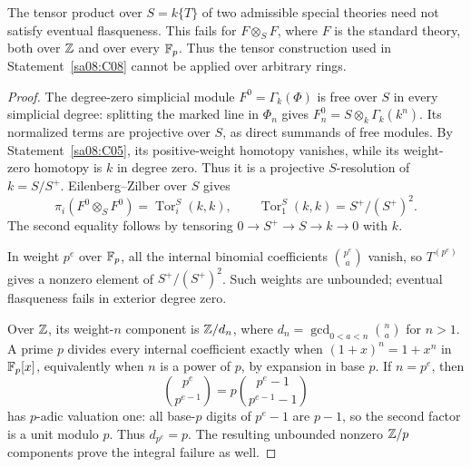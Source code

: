 \begin{proposition}\label{sa08:C11}
The tensor product over $S=k\{T\}$ of two admissible special
theories need not satisfy eventual flasqueness. This fails for
$F\otimes_S F$, where $F$ is the standard theory, both over $\mathbb Z$
and over every $\mathbb F_p$. Thus the tensor construction used in
Statement~\ref{sa08:C08} cannot be applied over arbitrary rings.
\end{proposition}
\begin{proof}
The degree-zero simplicial module $F^0=\Gamma_k(\Phi)$ is free over
$S$ in every simplicial degree: splitting the marked line in
$\Phi_n$ gives $F_n^0=S\otimes_k\Gamma_k(k^n)$. Its normalized
terms are projective over $S$, as direct summands of free modules.
By Statement~\ref{sa08:C05}, its positive-weight homotopy vanishes,
while its weight-zero homotopy is $k$ in degree zero. Thus it is a
projective $S$-resolution of $k=S/S^+$. Eilenberg--Zilber over $S$
gives
\[
 \pi_i(F^0\otimes_S F^0)=\operatorname{Tor}_i^S(k,k),\qquad
 \operatorname{Tor}_1^S(k,k)=S^+/(S^+)^2.
\]
The second equality follows by tensoring
$0\to S^+\to S\to k\to0$ with $k$.

In weight $p^e$ over $\mathbb F_p$, all the internal binomial coefficients
$\binom{p^e}{a}$ vanish, so $T^{(p^e)}$ gives a nonzero element of
$S^+/(S^+)^2$. Such weights are unbounded; eventual flasqueness
fails in exterior degree zero.

Over $\mathbb Z$, its weight-$n$ component is $\mathbb Z/d_n$, where
$d_n=\gcd_{0<a<n}\binom na$ for $n>1$. A prime $p$ divides every
internal coefficient exactly when
$(1+x)^n=1+x^n$ in $\mathbb F_p[x]$, equivalently when $n$ is a power
of $p$, by expansion in base $p$. If $n=p^e$, then
\[
 \binom{p^e}{p^{e-1}}
 =p\binom{p^e-1}{p^{e-1}-1}
\]
has $p$-adic valuation one: all base-$p$ digits of $p^e-1$ are
$p-1$, so the second factor is a unit modulo $p$. Thus
$d_{p^e}=p$. The resulting unbounded nonzero $\mathbb Z/p$ components
prove the integral failure as well.
\end{proof}


